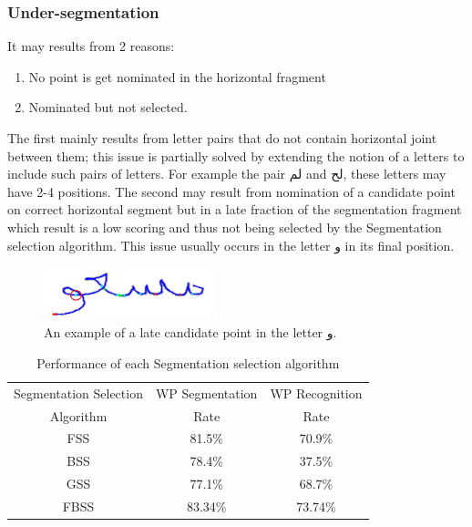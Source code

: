 \documentclass[journal,compsoc]{IEEEtran}
\begin{document}
\subsubsection{Under-segmentation}
It may results from 2 reasons:

\begin{enumerate}
\item No point is get nominated in the horizontal fragment
\item Nominated but not selected.
\end{enumerate}

The first mainly results from letter pairs that do not contain horizontal joint between them; this issue is partially solved by extending the notion of a letters to include such pairs of letters. For example the pair لم and لح, these letters may have 2-4 positions. The second may result from nomination of a candidate point on correct horizontal segment but in a late fraction of the segmentation fragment which result is a low scoring and thus not being selected by the Segmentation selection algorithm. This issue usually occurs in the letter و in its final position.

\begin{figure}[h]
\centering
\includegraphics[width=5cm]{./figures/undersegmentation_w}
\caption{An example of a late candidate point in the letter و.}
\label{fig:undersegmentation_w}
\end{figure}


\begin{table}[h]
\caption{Performance of each Segmentation selection algorithm}
\begin{tabular}{ | c | c | c | }
\hline
Segmentation Selection & WP Segmentation & WP Recognition \\
Algorithm & Rate & Rate \\
\hline                 
  FSS & 81.5\% & 70.9\% \\ 
  \hline
  BSS & 78.4\% &  37.5\% \\ 
 \hline
 GSS & 77.1\% & 68.7\% \\ 
 \hline
  FBSS & 83.34\% & 73.74\% \\
\hline
\end{tabular}
\centering
\label{table:ss_algorithms_results} 
\end{table}
\end{document}
